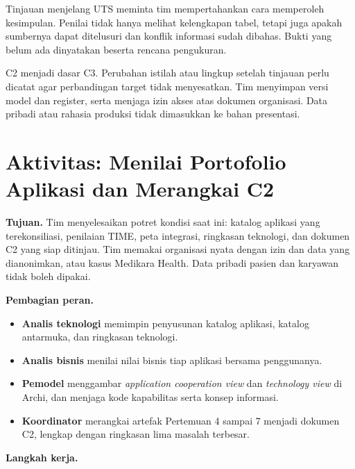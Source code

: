 Tinjauan menjelang UTS meminta tim mempertahankan cara memperoleh kesimpulan. Penilai tidak hanya melihat kelengkapan tabel, tetapi juga apakah sumbernya
dapat ditelusuri dan konflik informasi sudah dibahas. Bukti yang belum ada dinyatakan beserta rencana pengukuran.

C2 menjadi dasar C3. Perubahan istilah atau lingkup setelah tinjauan perlu dicatat agar perbandingan target tidak menyesatkan. Tim menyimpan versi model dan
register, serta menjaga izin akses atas dokumen organisasi. Data pribadi atau rahasia produksi tidak dimasukkan ke bahan presentasi.

\section{Aktivitas: Menilai Portofolio Aplikasi dan Merangkai C2}

\textbf{Tujuan.} Tim menyelesaikan potret kondisi saat ini: katalog aplikasi yang terekonsiliasi, penilaian TIME, peta integrasi, ringkasan teknologi, dan
dokumen C2 yang siap ditinjau. Tim memakai organisasi nyata dengan izin dan data yang dianonimkan, atau kasus Medikara Health. Data pribadi pasien dan
karyawan tidak boleh dipakai.

\textbf{Pembagian peran.}

\begin{itemize}
  \item \textbf{Analis teknologi} memimpin penyusunan katalog aplikasi, katalog antarmuka, dan ringkasan teknologi.
  \item \textbf{Analis bisnis} menilai nilai bisnis tiap aplikasi bersama penggunanya.
  \item \textbf{Pemodel} menggambar \textit{application cooperation view} dan \textit{technology view} di Archi, dan menjaga kode kapabilitas serta konsep informasi.
  \item \textbf{Koordinator} merangkai artefak Pertemuan 4 sampai 7 menjadi dokumen C2, lengkap dengan ringkasan lima masalah terbesar.
\end{itemize}

\textbf{Langkah kerja.}

